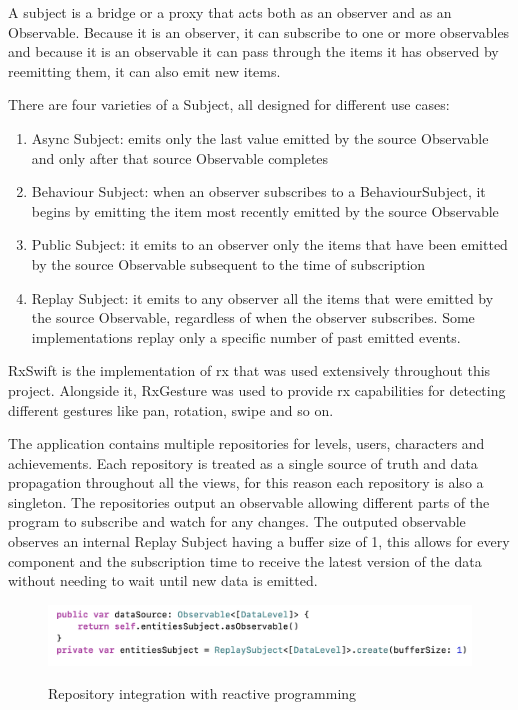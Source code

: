 \documentclass[12 pct]{report}
\begin{document}
A subject is a bridge or a proxy that acts both as an observer and as an Observable. Because it is an observer, it can subscribe to one or more observables and because it is an observable it can pass through the items it has observed by reemitting them, it can also emit new items.

There are four varieties of a Subject, all designed for different use cases:
\begin{enumerate}
\item Async Subject: emits only the last value emitted by the source Observable and only after that source Observable completes
\item Behaviour Subject: when an observer subscribes to a BehaviourSubject, it begins by emitting the item most recently emitted by the source Observable
\item Public Subject: it emits to an observer only the items that have been emitted by the source Observable subsequent to the time of subscription
\item Replay Subject: it emits to any observer all the items that were emitted by the source Observable, regardless of when the observer subscribes. Some implementations replay only a specific number of past emitted events.
\end{enumerate}

RxSwift is the implementation of rx that was used extensively throughout this project. Alongside it, RxGesture was used to provide rx capabilities for detecting different gestures like pan, rotation, swipe and so on.

The application contains multiple repositories for levels, users, characters and achievements. Each repository is treated as a single source of truth and data propagation throughout all the views, for this reason each repository is also a singleton. The repositories output an observable allowing different parts of the program to subscribe and watch for any changes. The outputed observable observes an internal Replay Subject having a buffer size of 1, this allows for every component and the subscription time to receive the latest version of the data without needing to wait until new data is emitted.
\begin{figure}[H]
\includegraphics[width=1.0\textwidth]{reactive-repository}
\centering
\label{fig:reactive-repository}
\caption{Repository integration with reactive programming }
\end{figure}
\end{document}
